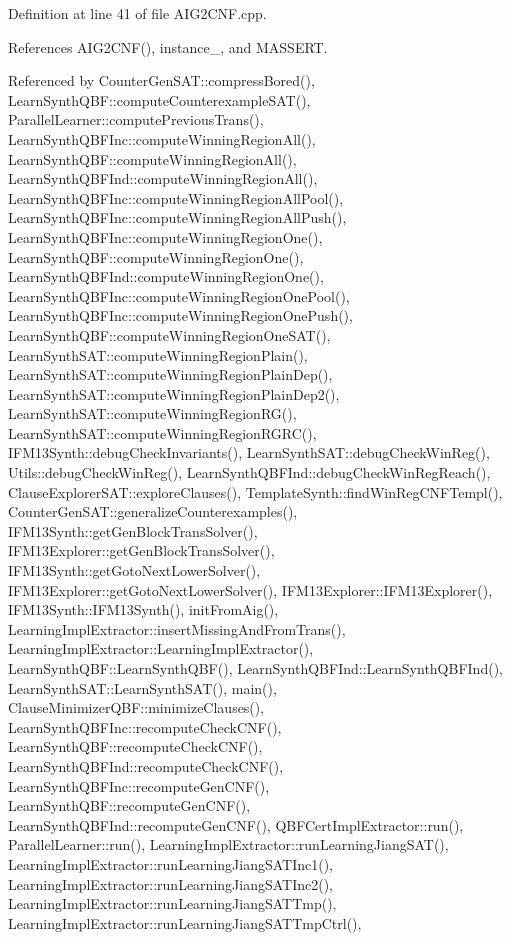 Definition at line 41 of file A\-I\-G2\-C\-N\-F.\-cpp.



References A\-I\-G2\-C\-N\-F(), instance\-\_\-, and M\-A\-S\-S\-E\-R\-T.



Referenced by Counter\-Gen\-S\-A\-T\-::compress\-Bored(), Learn\-Synth\-Q\-B\-F\-::compute\-Counterexample\-S\-A\-T(), Parallel\-Learner\-::compute\-Previous\-Trans(), Learn\-Synth\-Q\-B\-F\-Inc\-::compute\-Winning\-Region\-All(), Learn\-Synth\-Q\-B\-F\-::compute\-Winning\-Region\-All(), Learn\-Synth\-Q\-B\-F\-Ind\-::compute\-Winning\-Region\-All(), Learn\-Synth\-Q\-B\-F\-Inc\-::compute\-Winning\-Region\-All\-Pool(), Learn\-Synth\-Q\-B\-F\-Inc\-::compute\-Winning\-Region\-All\-Push(), Learn\-Synth\-Q\-B\-F\-Inc\-::compute\-Winning\-Region\-One(), Learn\-Synth\-Q\-B\-F\-::compute\-Winning\-Region\-One(), Learn\-Synth\-Q\-B\-F\-Ind\-::compute\-Winning\-Region\-One(), Learn\-Synth\-Q\-B\-F\-Inc\-::compute\-Winning\-Region\-One\-Pool(), Learn\-Synth\-Q\-B\-F\-Inc\-::compute\-Winning\-Region\-One\-Push(), Learn\-Synth\-Q\-B\-F\-::compute\-Winning\-Region\-One\-S\-A\-T(), Learn\-Synth\-S\-A\-T\-::compute\-Winning\-Region\-Plain(), Learn\-Synth\-S\-A\-T\-::compute\-Winning\-Region\-Plain\-Dep(), Learn\-Synth\-S\-A\-T\-::compute\-Winning\-Region\-Plain\-Dep2(), Learn\-Synth\-S\-A\-T\-::compute\-Winning\-Region\-R\-G(), Learn\-Synth\-S\-A\-T\-::compute\-Winning\-Region\-R\-G\-R\-C(), I\-F\-M13\-Synth\-::debug\-Check\-Invariants(), Learn\-Synth\-S\-A\-T\-::debug\-Check\-Win\-Reg(), Utils\-::debug\-Check\-Win\-Reg(), Learn\-Synth\-Q\-B\-F\-Ind\-::debug\-Check\-Win\-Reg\-Reach(), Clause\-Explorer\-S\-A\-T\-::explore\-Clauses(), Template\-Synth\-::find\-Win\-Reg\-C\-N\-F\-Templ(), Counter\-Gen\-S\-A\-T\-::generalize\-Counterexamples(), I\-F\-M13\-Synth\-::get\-Gen\-Block\-Trans\-Solver(), I\-F\-M13\-Explorer\-::get\-Gen\-Block\-Trans\-Solver(), I\-F\-M13\-Synth\-::get\-Goto\-Next\-Lower\-Solver(), I\-F\-M13\-Explorer\-::get\-Goto\-Next\-Lower\-Solver(), I\-F\-M13\-Explorer\-::\-I\-F\-M13\-Explorer(), I\-F\-M13\-Synth\-::\-I\-F\-M13\-Synth(), init\-From\-Aig(), Learning\-Impl\-Extractor\-::insert\-Missing\-And\-From\-Trans(), Learning\-Impl\-Extractor\-::\-Learning\-Impl\-Extractor(), Learn\-Synth\-Q\-B\-F\-::\-Learn\-Synth\-Q\-B\-F(), Learn\-Synth\-Q\-B\-F\-Ind\-::\-Learn\-Synth\-Q\-B\-F\-Ind(), Learn\-Synth\-S\-A\-T\-::\-Learn\-Synth\-S\-A\-T(), main(), Clause\-Minimizer\-Q\-B\-F\-::minimize\-Clauses(), Learn\-Synth\-Q\-B\-F\-Inc\-::recompute\-Check\-C\-N\-F(), Learn\-Synth\-Q\-B\-F\-::recompute\-Check\-C\-N\-F(), Learn\-Synth\-Q\-B\-F\-Ind\-::recompute\-Check\-C\-N\-F(), Learn\-Synth\-Q\-B\-F\-Inc\-::recompute\-Gen\-C\-N\-F(), Learn\-Synth\-Q\-B\-F\-::recompute\-Gen\-C\-N\-F(), Learn\-Synth\-Q\-B\-F\-Ind\-::recompute\-Gen\-C\-N\-F(), Q\-B\-F\-Cert\-Impl\-Extractor\-::run(), Parallel\-Learner\-::run(), Learning\-Impl\-Extractor\-::run\-Learning\-Jiang\-S\-A\-T(), Learning\-Impl\-Extractor\-::run\-Learning\-Jiang\-S\-A\-T\-Inc1(), Learning\-Impl\-Extractor\-::run\-Learning\-Jiang\-S\-A\-T\-Inc2(), Learning\-Impl\-Extractor\-::run\-Learning\-Jiang\-S\-A\-T\-Tmp(), Learning\-Impl\-Extractor\-::run\-Learning\-Jiang\-S\-A\-T\-Tmp\-Ctrl(), 